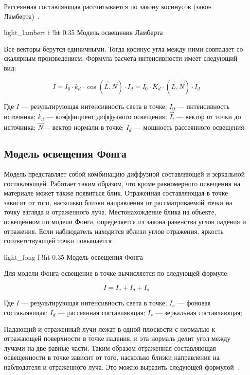 Рассеянная составляющая рассчитывается по закону косинусов (закон Ламберта)~\cite{LIGHT}.

    {light_lambert}
    {f}
    {!ht}
    {0.35\textwidth}
    {Модель освещения Ламберта}

Все векторы берутся единичными. Тогда косинус угла между ними совпадает 
со скалярным произведением. Формула расчета интенсивности имеет следующий вид: 

\begin{equation}
    I = I_{0} \cdot k_{d} \cdot \cos(\vec{L}, \vec{N}) \cdot I_{d} = I_{0} \cdot K_{d} \cdot (\vec{L}, \vec{N}) \cdot I_{d}
\end{equation}

Где $I$ — результирующая интенсивность света в точке; 
$I_{0}$ — интенсивность источника; 
$k_{d}$ — коэффициент диффузного освещения;  
$\vec{L}$ — вектор от точки до источника; 
$\vec{N}$— вектор нормали в точке; 
$I_{d}$ — мощность рассеянного освещения.


\subsection{Модель освещения Фонга}
Модель представляет собой комбинацию диффузной составляющей и зеркальной составляющей. 
Работает таким образом, что кроме равномерного освещения на материале может также появиться блик. 
Отраженная составляющая в точке зависит от того, насколько близки направления от рассматриваемой 
точки на точку взгляда и отраженного луча. 
Местонахождение блика на объекте, освещенном по модели Фонга, определяется из закона равенства углов падения и отражения. 
Если наблюдатель находится вблизи углов отражения, яркость соответствующей точки повышается~\cite{LIGHT}.

    {light_fong}
    {f}
    {!ht}
    {0.35\textwidth}
    {Модель освещения Фонга}

Для модели Фонга освещение в точке вычисляется по следующей формуле:

\begin{equation}
    I = I_{a} + I_{d} + I_{s}
\end{equation}

Где $I$ --- результирующая интенсивность света в точке; 
$I_{a}$ --- фоновая составляющая; 
$I_{d}$ --- рассеянная составляющая;
$I_{s}$ --- зеркальная составляющая;


Падающий и отраженный лучи лежат в одной плоскости с нормалью к отражающей поверхности в точке падения, и эта нормаль делит угол между лучами на две равные части. 
Таким образом отраженная составляющая освещенности в точке зависит от того, насколько близки направления на наблюдателя и отраженного луча. 
Это можно выразить следующей формулой~\cite{LIGHT}.


